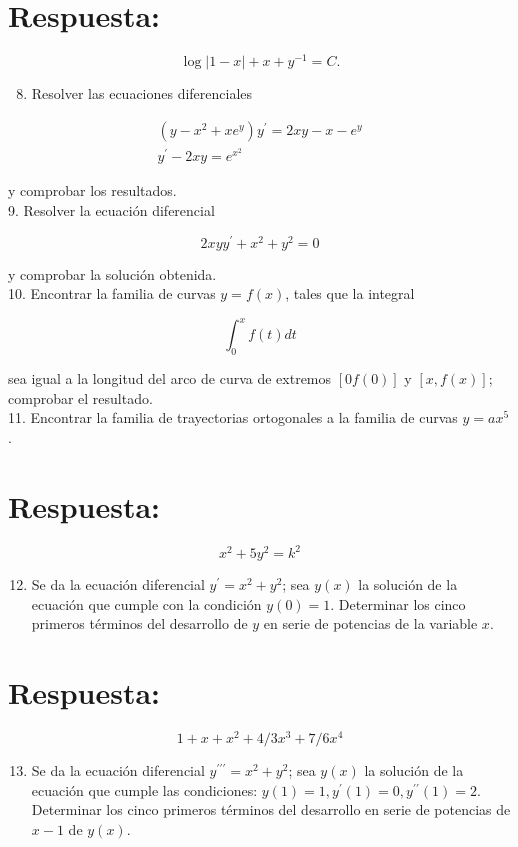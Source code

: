\documentclass[10pt]{article}
\theoremstyle{plain}
\theoremstyle{definition}
\theoremstyle{remark}
\begin{document}
\section*{Respuesta:}
$$
\log |1-x|+x+y^{-1}=C .
$$

\begin{enumerate}
  \setcounter{enumi}{7}
  \item Resolver las ecuaciones diferenciales
\end{enumerate}

$$
\begin{gathered}
\left(y-x^{2}+x e^{y}\right) y^{\prime}=2 x y-x-e^{y} \\
y^{\prime}-2 x y=e^{x^{2}}
\end{gathered}
$$

y comprobar los resultados.\\
9. Resolver la ecuación diferencial

$$
2 x y y^{\prime}+x^{2}+y^{2}=0
$$

y comprobar la solución obtenida.\\
10. Encontrar la familia de curvas $y=f(x)$, tales que la integral

$$
\int_{0}^{x} f(t) d t
$$

sea igual a la longitud del arco de curva de extremos $[0 f(0)]$ y $[x, f(x)]$; comprobar el resultado.\\
11. Encontrar la familia de trayectorias ortogonales a la familia de curvas $y=a x^{5}$.

\section*{Respuesta:}
$$
x^{2}+5 y^{2}=k^{2}
$$

\begin{enumerate}
  \setcounter{enumi}{11}
  \item Se da la ecuación diferencial $y^{\prime}=x^{2}+y^{2}$; sea $y(x)$ la solución de la ecuación que cumple con la condición $y(0)=1$. Determinar los cinco primeros términos del desarrollo de $y$ en serie de potencias de la variable $x$.
\end{enumerate}

\section*{Respuesta:}
$$
1+x+x^{2}+4 / 3 x^{3}+7 / 6 x^{4}
$$

\begin{enumerate}
  \setcounter{enumi}{12}
  \item Se da la ecuación diferencial $y^{\prime \prime \prime}=x^{2}+y^{2}$; sea $y(x)$ la solución de la ecuación que cumple las condiciones: $y(1)=1, y^{\prime}(1)=0, y^{\prime \prime}(1)=2$. Determinar los cinco primeros términos del desarrollo en serie de potencias de $x-1$ de $y(x)$.
\end{enumerate}
\end{document}
